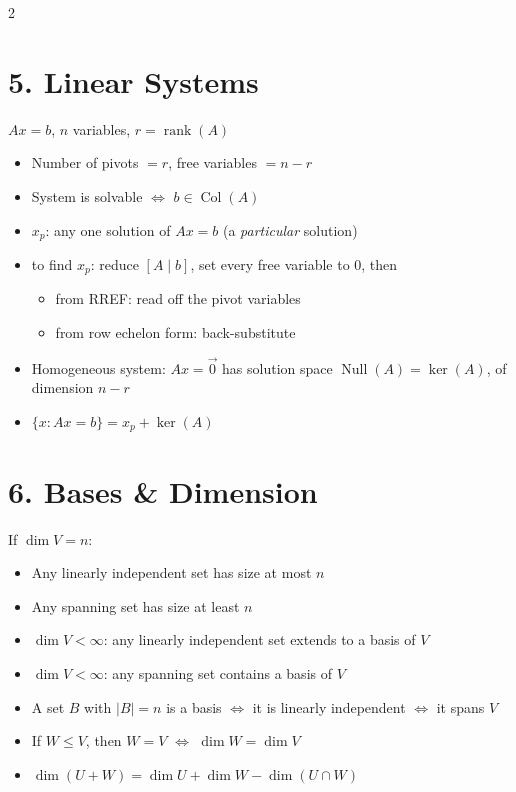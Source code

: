 \documentclass[fleqn]{article}
\begin{document}
\begin{multicols}{2}
\section*{5. Linear Systems}
$Ax=b$, $n$ variables, $r = \operatorname{rank}(A)$
\begin{itemize}
\item Number of pivots $= r$, free variables $= n-r$
\item System is solvable $\iff$ $b \in \operatorname{Col}(A)$
\item $x_p$: any one solution of $Ax=b$ (a \emph{particular} solution)
\item to find $x_p$: reduce $[A \mid b]$, set every free variable to $0$, then
\begin{itemize}
\item from RREF: read off the pivot variables
\item from row echelon form: back-substitute
\end{itemize}
\item Homogeneous system: $Ax=\vec{0}$ has solution space $\operatorname{Null}(A) = \ker(A)$, of dimension $n-r$
\item $\{x : Ax=b\} = x_p + \ker(A)$
\end{itemize}

\vspace{-3ex}
\section*{6. Bases \& Dimension}
If $\dim V = n$:
\begin{itemize}
\item Any linearly independent set has size at most $n$
\item Any spanning set has size at least $n$
\item $\dim V<\infty$: any linearly independent set extends to a basis of $V$
\item $\dim V<\infty$: any spanning set contains a basis of $V$
\item A set $B$ with $|B|=n$ is a basis $\iff$ it is linearly independent $\iff$ it spans $V$
\item If $W \le V$, then $W=V$ $\iff$ $\dim W = \dim V$
\item $\dim(U+W) = \dim U + \dim W - \dim(U \cap W)$
\end{itemize}


\end{multicols}
\end{document}
